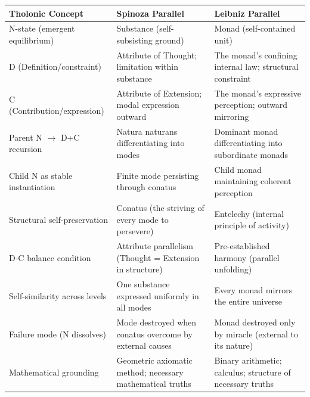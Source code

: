 \documentclass[
  11pt,
  letterpaper,
]{article}
\begin{document}
\begin{longtable}[]{@{}
  >{\raggedright\arraybackslash}p{}
  >{\raggedright\arraybackslash}p{}
  >{\raggedright\arraybackslash}p{}@{}}
\toprule\noalign{}
\begin{minipage}[b]{\linewidth}\raggedright
Tholonic Concept
\end{minipage} & \begin{minipage}[b]{\linewidth}\raggedright
Spinoza Parallel
\end{minipage} & \begin{minipage}[b]{\linewidth}\raggedright
Leibniz Parallel
\end{minipage} \\
\midrule\noalign{}
\endhead
\bottomrule\noalign{}
\endlastfoot
N-state (emergent equilibrium) & Substance (self-subsisting ground) &
Monad (self-contained unit) \\
D (Definition/constraint) & Attribute of Thought; limitation within
substance & The monad's confining internal law; structural constraint \\
C (Contribution/expression) & Attribute of Extension; modal expression
outward & The monad's expressive perception; outward mirroring \\
Parent N \(\to\) D+C recursion & Natura naturans differentiating into
modes & Dominant monad differentiating into subordinate monads \\
Child N as stable instantiation & Finite mode persisting through conatus
& Child monad maintaining coherent perception \\
Structural self-preservation & Conatus (the striving of every mode to
persevere) & Entelechy (internal principle of activity) \\
D-C balance condition & Attribute parallelism (Thought = Extension in
structure) & Pre-established harmony (parallel unfolding) \\
Self-similarity across levels & One substance expressed uniformly in all
modes & Every monad mirrors the entire universe \\
Failure mode (N dissolves) & Mode destroyed when conatus overcome by
external causes & Monad destroyed only by miracle (external to its
nature) \\
Mathematical grounding & Geometric axiomatic method; necessary
mathematical truths & Binary arithmetic; calculus; structure of
necessary truths \\
\end{longtable}
\end{document}
